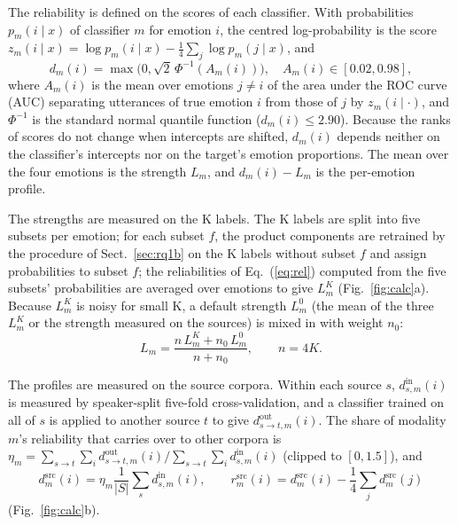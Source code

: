 The reliability is defined on the scores of each classifier. With probabilities $p_m(i\mid x)$ of classifier $m$ for emotion $i$, the centred log-probability is the score $z_m(i\mid x)=\log p_m(i\mid x)-\frac14\sum_j\log p_m(j\mid x)$, and
\begin{equation}\label{eq:rel}
d_m(i)=\max\!\big(0,\sqrt2\,\Phi^{-1}(A_m(i))\big),\quad A_m(i)\in[0.02,0.98],
\end{equation}
where $A_m(i)$ is the mean over emotions $j\neq i$ of the area under the ROC curve (AUC) separating utterances of true emotion $i$ from those of $j$ by $z_m(i\mid\cdot)$, and $\Phi^{-1}$ is the standard normal quantile function ($d_m(i)\le 2.90$). Because the ranks of scores do not change when intercepts are shifted, $d_m(i)$ depends neither on the classifier's intercepts nor on the target's emotion proportions. The mean over the four emotions is the strength $L_m$, and $d_m(i)-L_m$ is the per-emotion profile.

The strengths are measured on the K labels. The K labels are split into five subsets per emotion; for each subset $f$, the product components are retrained by the procedure of Sect.~\ref{sec:rq1b} on the K labels without subset $f$ and assign probabilities to subset $f$; the reliabilities of Eq.~(\ref{eq:rel}) computed from the five subsets' probabilities are averaged over emotions to give $L^{K}_m$ (Fig.~\ref{fig:calc}a). Because $L^{K}_m$ is noisy for small K, a default strength $L^{0}_m$ (the mean of the three $L^{K}_m$ or the strength measured on the sources) is mixed in with weight $n_0$:
\begin{equation}
L_m=\frac{n\,L^{K}_m+n_0\,L^{0}_m}{n+n_0},\qquad n=4K.
\end{equation}

The profiles are measured on the source corpora. Within each source $s$, $d^{\mathrm{in}}_{s,m}(i)$ is measured by speaker-split five-fold cross-validation, and a classifier trained on all of $s$ is applied to another source $t$ to give $d^{\mathrm{out}}_{s\to t,m}(i)$. The share of modality $m$'s reliability that carries over to other corpora is $\eta_m=\sum_{s\to t}\sum_i d^{\mathrm{out}}_{s\to t,m}(i)/\sum_{s\to t}\sum_i d^{\mathrm{in}}_{s,m}(i)$ (clipped to $[0,1.5]$), and
\begin{equation}
d^{\mathrm{src}}_m(i)=\eta_m\frac{1}{|S|}\sum_s d^{\mathrm{in}}_{s,m}(i),\qquad r^{\mathrm{src}}_m(i)=d^{\mathrm{src}}_m(i)-\frac14\sum_j d^{\mathrm{src}}_m(j)
\end{equation}
(Fig.~\ref{fig:calc}b).

